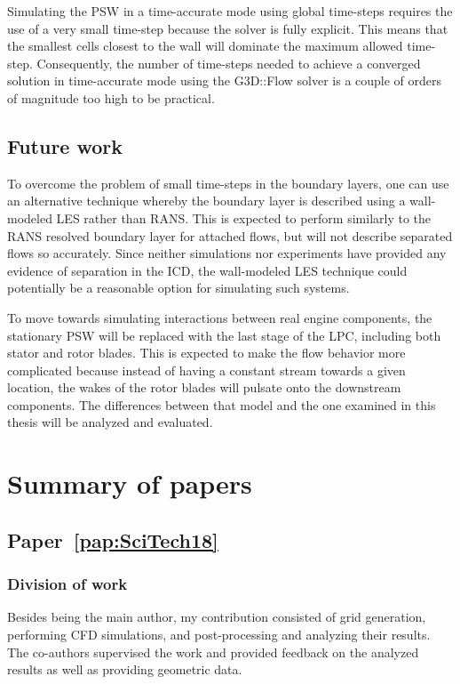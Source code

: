 Simulating the PSW in a time-accurate mode using global time-steps requires the use of a very small time-step because the solver is fully explicit. This means that the smallest cells closest to the wall will dominate the maximum allowed time-step. Consequently, the number of time-steps needed to achieve a converged solution in time-accurate mode using the G3D::Flow solver is a couple of orders of magnitude too high to be practical.

\section{Future work}
To overcome the problem of small time-steps in the boundary layers, one can use an alternative technique whereby the boundary layer is described using a wall-modeled LES rather than RANS. This is expected to perform similarly to the RANS resolved boundary layer for attached flows, but will not describe separated flows so accurately. Since neither simulations nor experiments have provided any evidence of separation in the ICD, the wall-modeled LES technique could potentially be a reasonable option for simulating such systems.

To move towards simulating interactions between real engine components, the stationary PSW will be replaced with the last stage of the LPC, including both stator and rotor blades. This is expected to make the flow behavior more complicated because instead of having a constant stream towards a given location, the wakes of the rotor blades will pulsate onto the downstream components. The differences between that model and the one examined in this thesis will be analyzed and evaluated.


%           
\chapter{Summary of papers\label{ch:summary}}

\section{Paper~\ref{pap:SciTech18}} 
\subsection{Division of work}
Besides being the main author, my contribution consisted of grid generation, performing CFD simulations, and post-processing and analyzing their results. The co-authors supervised the work and provided feedback on the analyzed results as well as providing geometric data.
